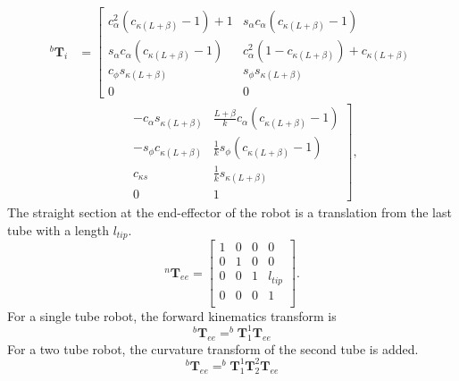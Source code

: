 \begin{equation}\label{curvature-transformation}
\begin{aligned}
^b \textbf{T}_i &=
\left[\begin{matrix}
  c^2_\alpha (c_{\kappa  \left(L+\beta\right)} - 1) + 1 & s_\alpha c_\alpha (c_{\kappa  \left(L+\beta\right)} - 1) \\
  s_\alpha c_\alpha (c_{\kappa  \left(L+\beta\right)} - 1) & c^2_\alpha (1 - c_{\kappa  \left(L+\beta\right)}) + c_{\kappa  \left(L+\beta\right)} \\
  c_{\phi} s_{\kappa  \left(L+\beta\right)} & s_{\phi} s_{\kappa  \left(L+\beta\right)} \\
  0 & 0
\end{matrix}\right.\\
&\qquad\qquad
\left.\begin{matrix}
  - c_\alpha s_{\kappa  \left(L+\beta\right)}  & \frac{L+\beta}{k} c_\alpha (c_{\kappa \left(L+\beta\right)} - 1) \\
  - s_\phi c_{\kappa \left(L+\beta\right)} & \frac{1}{k} s_\phi (c_{\kappa  \left(L+\beta\right)} - 1) \\
  c_{\kappa s} & \frac{1}{k} s_{\kappa  \left(L+\beta\right)} \\
  0 & 1
\end{matrix}\right],
\end{aligned}
\end{equation}
The straight section at the end-effector of the robot is a translation from the last tube with a length $l_{tip}$.
\begin{equation}
\label{straight-ee}
^n \textbf{T}_{ee} =
\left[\begin{matrix}
1 & 0 & 0 & 0 \\
0 & 1 & 0 & 0 \\
0 & 0 & 1 & l_{tip} \\
0 & 0 & 0 & 1 \\
\end{matrix}\right].
\end{equation}
For a single tube robot, the forward kinematics transform is
\begin{equation}
^b \textbf{T}_{ee} = ^b \textbf{T}_1 ^1 \textbf{T}_{ee}
\end{equation}
For a two tube robot, the curvature transform of the second tube is added.
\begin{equation}
^b \textbf{T}_{ee} = ^b \textbf{T}_1 ^1 \textbf{T}_2  ^2 \textbf{T}_{ee}
\end{equation}

